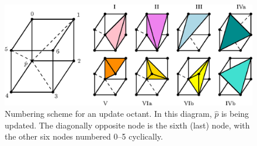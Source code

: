 \documentclass[eikonal.tex]{subfiles}
\begin{document}
\begin{figure}[t]
  \centering
  \includegraphics{simplex-groups.eps}
  \caption{Numbering scheme for an update octant. In this diagram,
    $\hat{p}$ is being updated. The diagonally opposite node is the
    sixth (last) node, with the other six nodes numbered 0--5
    cyclically.}\label{fig:octant-numbering}
\end{figure}
\end{document}
